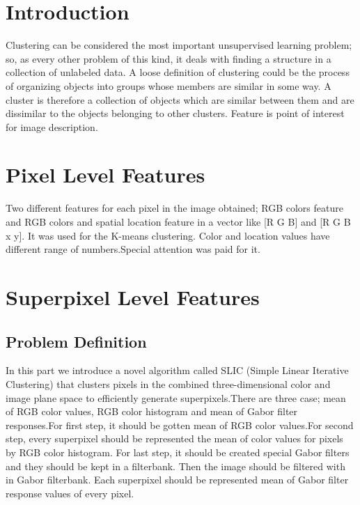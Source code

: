 \documentclass[12pt]{article}
\begin{document}

\tableofcontents
\pagebreak

\section*{Introduction}
Clustering can be considered the most important unsupervised learning problem; so, as every other problem of this kind, it deals with finding a structure in a collection of unlabeled data.
A loose definition of clustering could be the process of organizing objects into groups whose members are similar in some way.
A cluster is therefore a collection of objects which are similar between them and are dissimilar to the objects belonging to other clusters. Feature is point of interest for image description.


\section{Pixel Level Features}

Two different features for each pixel in the image obtained; RGB colors feature and RGB colors and spatial location feature in a vector like [R G B] and [R G B x y]. It was used for the K-means clustering. Color and location values have different range of numbers.Special attention was paid for it.

\section{Superpixel Level Features}
\subsection{Problem Definition}
In this part we introduce a novel algorithm called SLIC (Simple Linear Iterative Clustering) that clusters pixels in the combined three-dimensional color and image plane space to efficiently generate superpixels.There are three case; mean of RGB color values, RGB color histogram and mean of Gabor filter responses.For first step, it should be gotten mean of RGB color values.For second step, every superpixel should be represented the mean of color values for pixels by RGB color histogram. For last step, it should be created special Gabor filters and they should be kept in a filterbank. Then the image should be filtered with in Gabor filterbank. Each superpixel should be represented mean of Gabor filter response values of every pixel.
\end{document}

